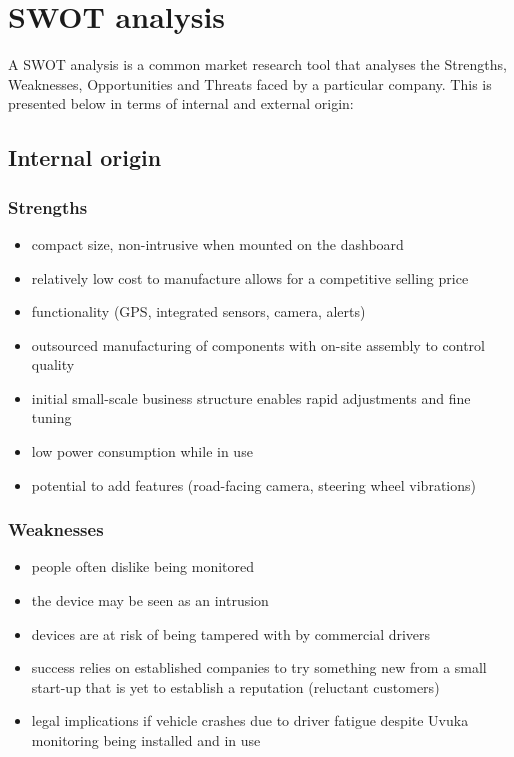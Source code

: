  \section{SWOT analysis}
A SWOT analysis is a common market research tool that analyses the Strengths, Weaknesses, Opportunities and Threats faced by a particular company. This is presented below in terms of internal and external origin:
\pagebreak
\subsection{Internal origin}
\subsubsection{Strengths}
\vskip8pt
\begin{itemize}
\item compact size, non-intrusive when mounted on the dashboard
\item relatively low cost to manufacture allows for a competitive selling price
\item functionality (GPS, integrated sensors, camera, alerts)
\item outsourced manufacturing of components with on-site assembly to control quality
\item initial small-scale business structure enables rapid adjustments and fine tuning
\item low power consumption while in use
\item potential to add features (road-facing camera, steering wheel vibrations)
\end{itemize}
\vskip15pt
\subsubsection{Weaknesses}
\vskip8pt
\begin{itemize}
\item people often dislike being monitored
\item the device may be seen as an intrusion
\item devices are at risk of being tampered with by commercial drivers
\item success relies on established companies to try something new from a small start-up that is yet to establish a reputation (reluctant customers)
\item legal implications if vehicle crashes due to driver fatigue despite Uvuka monitoring being installed and in use
\end{itemize}
\vskip15pt
